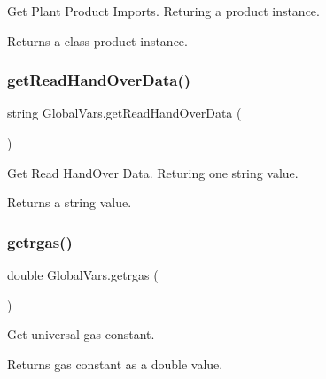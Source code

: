 Get Plant Product Imports. Returing a product instance. 

\begin{DoxyReturn}{Returns}
a class product instance. 
\end{DoxyReturn}
\mbox{\label{class_global_vars_a0989d5988f75ed2be0993c16cb3397be}} 
\subsubsection{\texorpdfstring{getReadHandOverData()}{getReadHandOverData()}}
{\footnotesize\ttfamily string Global\+Vars.\+get\+Read\+Hand\+Over\+Data (\begin{DoxyParamCaption}{ }\end{DoxyParamCaption})\hspace{0.3cm}{\ttfamily [inline]}}



Get Read Hand\+Over Data. Returing one string value. 

\begin{DoxyReturn}{Returns}
a string value. 
\end{DoxyReturn}
\mbox{\label{class_global_vars_ae9a1a598a830740085352e88a412d302}} 
\subsubsection{\texorpdfstring{getrgas()}{getrgas()}}
{\footnotesize\ttfamily double Global\+Vars.\+getrgas (\begin{DoxyParamCaption}{ }\end{DoxyParamCaption})\hspace{0.3cm}{\ttfamily [inline]}}



Get universal gas constant. 

\begin{DoxyReturn}{Returns}
gas constant as a double value. 
\end{DoxyReturn}
\mbox{\label{class_global_vars_a4b40cfa99d20bf081c2fb84351a31185}} 
